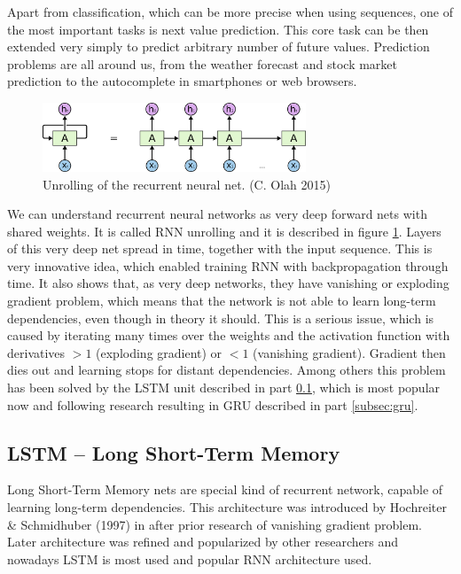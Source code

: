 Apart from classification, which can be more precise when using sequences, one of the most important tasks is next value prediction. This core task can be then extended very simply to predict arbitrary number of future values. Prediction problems are all around us, from the weather forecast and stock market prediction to the autocomplete in smartphones or web browsers.

\begin{figure}[!ht]
	\centering
	\includegraphics[width=0.7\textwidth]{fig/RNN-unrolled.png}
	\caption{Unrolling of the recurrent neural net. (C. Olah 2015)
		\label{fig:rnn-unroll}}
\end{figure}

We can understand recurrent neural networks as very deep forward nets with shared weights. It is called RNN unrolling and it is described in figure \ref{fig:rnn-unroll}. Layers of this very deep net spread in time, together with the input sequence. This is very innovative idea, which enabled training RNN with backpropagation through time. It also shows that, as very deep networks, they have vanishing or exploding gradient problem, which means that the network is not able to learn long-term dependencies, even though in theory it should. This is a serious issue,  which is caused by iterating many times over the weights and the activation function with derivatives $>1$ (exploding gradient) or $<1$ (vanishing gradient). Gradient then dies out and learning stops for distant dependencies. Among others this problem has been solved by the LSTM unit described in part \ref{subsec:lstm}, which is most popular now and following research resulting in GRU described in part \ref{subsec:gru}.

		\subsection{LSTM -- Long Short-Term Memory}\label{subsec:lstm}

Long Short-Term Memory nets are special kind of recurrent network, capable of learning long-term dependencies. This architecture was introduced by Hochreiter \& Schmidhuber (1997) in \cite{Hochreiter:1997:LSM:1246443.1246450} after prior research of vanishing gradient problem. Later architecture was refined and popularized by other researchers and nowadays LSTM is most used and popular RNN architecture used.

